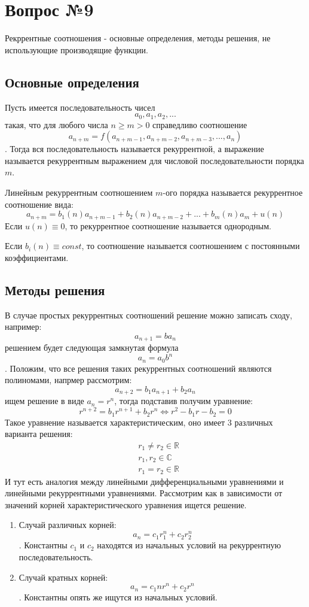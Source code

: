 \chapter{Вопрос №9}

Рекррентные соотношения - основные определения, методы решения, не использующие производящие функции.

\section{Основные определения}

Пусть имеется последовательность чисел $$ a_0, a_1, a_2, ... $$ такая, что для любого числа $n \ge m > 0$ справедливо соотношение $$ a_{n+m} = f\left(a_{n+m-1},a_{n+m-2},a_{n+m-3},...,a_n\right) $$. Тогда вся последовательность называется рекуррентной, а выражение называется рекуррентным выражением для числовой последовательности порядка $m$.

Линейным рекуррентным соотношением $m$-ого порядка называется рекуррентное соотношение вида:
\begin{equation}
	a_{n+m} = b_1\left(n\right)a_{n+m-1} + b_2\left(n\right)a_{n+m-2} + ... + b_m\left(n\right)a_m + u\left(n\right)
\end{equation}
Если $u\left(n\right) \equiv 0$, то рекуррентное соотношение называется однородным.

Если $b_i\left(n\right) \equiv const$, то соотношение называется соотношением с постоянными коэффициентами.

\section{Методы решения}

В случае простых рекуррентных соотношений решение можно записать сходу, например:
\[
	a_{n+1} = ba_n
\]
решением будет следующая замкнутая формула $$ a_n = a_0 b^n $$. Положим, что все решения таких рекуррентных соотношений являются полиномами, напрмер рассмотрим:
\[
	a_{n+2} = b_1 a_{n+1} + b_2 a_n
\]
ищем решение в виде $a_n = r^n$, тогда подставив получим уравнение:
\[
	r^{n+2} = b_1 r^{n+1} + b_2 r^{n} \Leftrightarrow r^2 - b_1 r - b_2 = 0
\]
Такое уравнение называется характеристическим, оно имеет 3 различных варианта решения:
\[
	\begin{split}
		& r_1 \not = r_2 \in \mathbb{R}\\
		& r_1,r_2 \in \mathbb{C}\\
		& r_1 = r_2 \in \mathbb{R}
	\end{split}
\]
И тут есть аналогия между линейными дифференциальными уравнениями и линейными рекуррентными уравнениями. Рассмотрим как в зависимости от значений корней характеристического уравнения ищется решение.
\begin{enumerate}
\item Случай различных корней: $$ a_n = c_1 r_1^n + c_2 r_2^n $$. Константны $c_1$ и $c_2$ находятся из начальных условий на рекуррентную последовательность.

\item Случай кратных корней: $$ a_n = c_1 nr^n + c_2r^n $$. Константны опять же ищутся из начальных условий.
\end{enumerate}

